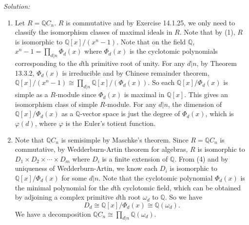 \documentclass[a4paper, 12pt]{article}
\newenvironment{solution}
    {\textit{Solution:}}
    {}
\begin{document}
\begin{solution}
\begin{enumerate}[(1)]
\item Let \(R=\mathbb{Q}C_n\). \(R\) is commutative and by Exercise 14.1.25, we only need to classify the isomorphism classes of maximal ideals in \(R\). Note that by (1), \(R\) is isomorphic to 
\(\mathbb{Q}[x]/(x^n-1)\). Note that on the field \(\mathbb{Q}\), \(x^n-1=\prod_{d|n} \Phi_d(x)\) where \(\Phi_d(x)\) is the cyclotomic polynomials corresponding to the \(d\)th primitive root of unity. For any \(d|n\), by Theorem 13.3.2, \(\Phi_d(x)\) is 
irreducible and by Chinese remainder theorem, \(\mathbb{Q}[x]/(x^n-1)\cong \prod_{d|n}\mathbb{Q}[x]/(\Phi_d(x))\). So each \(\mathbb{Q}[x]/\Phi_d(x)\) is simple as a \(R\)-module since \(\Phi_d(x)\) is maximal in \(\mathbb{Q}[x]\). This gives 
an isomorphism class of simple \(R\)-module. For any \(d|n\), the dimension of \(\mathbb{Q}[x]/\Phi_d(x)\) as a \(\mathbb{Q}\)-vector space is just the degree of \(\Phi_d(x)\), which is \(\varphi(d)\), where \(\varphi\) is the Euler's totient function. 
\item Note that \(\mathbb{Q}C_n\) is semisimple by Maschke's theorem.  Since \(R=\mathbb{Q}C_n\) is commutative, by Wedderburn-Artin theorem for algebras, \(R\) is isomorphic to \(D_1\times D_2\times\cdots\times D_m\) where \(D_i\) is a finite extension of \(\mathbb{Q}\). From (4) and by uniqueness of Wedderburn-Artin, we know each \(D_i\) is isomorphic to 
\(\mathbb{Q}[x]/\Phi_d(x)\) for some \(d|n\). Note that the cyclotomic polynomial \(\Phi_d(x)\) is the minimal polynomial for the \(d\)th cyclotomic field, which can be obtained by adjoining a complex primitive \(d\)th root \(\omega_d\) to \(\mathbb{Q}\). So we have 
\[D_d\cong \mathbb{Q}[x]/\Phi_d(x)\cong \mathbb{Q}(\omega_d).\]
We have a decomposition \(\mathbb{Q}C_n\cong \prod_{d|n} \mathbb{Q}(\omega_d)\).
\end{enumerate}
\end{solution}
\end{document}
